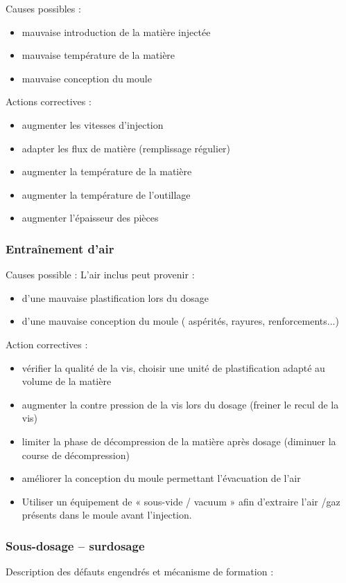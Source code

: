 \documentclass[11pt,oneside]{article}
\begin{document}
       Causes possibles : 
\begin{itemize}
 \item mauvaise introduction de la matière injectée 
 \item mauvaise température de la matière 
 \item mauvaise conception du moule 
\end{itemize}
 
       Actions correctives :
\begin{itemize}
\item augmenter les vitesses d’injection 
 \item adapter les flux de matière (remplissage régulier) 
 \item augmenter la température de la matière 
 \item augmenter la température de l’outillage 
 \item augmenter l’épaisseur des pièces 
\end{itemize}
 
       \subsubsection{Entraînement d’air}
       Causes possible : 
       L’air inclus peut provenir : 
\begin{itemize}
 \item d’une mauvaise plastification lors du dosage 
 \item d’une mauvaise conception du moule ( aspérités, rayures,
renforcements...) 
\end{itemize}
 
       Action correctives : 
\begin{itemize}
 \item vérifier la qualité de la vis, choisir une unité de plastification
adapté au volume de la matière 
 \item augmenter la contre pression de la vis lors du dosage (freiner le recul
de la vis) 
 \item limiter la phase de décompression de la matière après dosage (diminuer
la course de décompression) 
 \item améliorer la conception du moule permettant l’évacuation de l’air 
 \item Utiliser un équipement de « sous-vide / vacuum » afin d'extraire l'air
/gaz présents dans le moule avant l'injection. 
\end{itemize}
 
       \subsubsection{Sous-dosage -- surdosage}
       Description des défauts engendrés et mécanisme de formation : 
                                                                    
\end{document}
